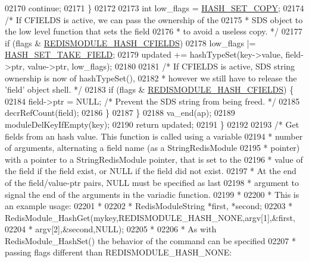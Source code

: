 \begin{DoxyCode}
{{{02170             \textcolor{keywordflow}{continue};
02171         \}
02172 
02173         \textcolor{keywordtype}{int} low\_flags = \hyperlink{server_8h_ad182dd9d0a3945ad3fb4045e559b612e}{HASH\_SET\_COPY};
02174         \textcolor{comment}{/* If CFIELDS is active, we can pass the ownership of the}
02175 \textcolor{comment}{         * SDS object to the low level function that sets the field}
02176 \textcolor{comment}{         * to avoid a useless copy. */}
02177         \textcolor{keywordflow}{if} (flags & \hyperlink{redismodule_8h_a0b45cc86dbd926d0af5d59a5f4c0e0da}{REDISMODULE\_HASH\_CFIELDS})
02178             low\_flags |= \hyperlink{server_8h_a9c13f8e0e439bfde94687cb01ab81b4b}{HASH\_SET\_TAKE\_FIELD};
02179         updated += hashTypeSet(key->value, field->ptr, value->ptr, low\_flags);
02180 
02181         \textcolor{comment}{/* If CFIELDS is active, SDS string ownership is now of hashTypeSet(),}
02182 \textcolor{comment}{         * however we still have to release the 'field' object shell. */}
02183         \textcolor{keywordflow}{if} (flags & \hyperlink{redismodule_8h_a0b45cc86dbd926d0af5d59a5f4c0e0da}{REDISMODULE\_HASH\_CFIELDS}) \{
02184            field->ptr = NULL; \textcolor{comment}{/* Prevent the SDS string from being freed. */}
02185            decrRefCount(field);
02186         \}
02187     \}
02188     va\_end(ap);
02189     moduleDelKeyIfEmpty(key);
02190     \textcolor{keywordflow}{return} updated;
02191 \}
02192 
02193 \textcolor{comment}{/* Get fields from an hash value. This function is called using a variable}
02194 \textcolor{comment}{ * number of arguments, alternating a field name (as a StringRedisModule}
02195 \textcolor{comment}{ * pointer) with a pointer to a StringRedisModule pointer, that is set to the}
02196 \textcolor{comment}{ * value of the field if the field exist, or NULL if the field did not exist.}
02197 \textcolor{comment}{ * At the end of the field/value-ptr pairs, NULL must be specified as last}
02198 \textcolor{comment}{ * argument to signal the end of the arguments in the variadic function.}
02199 \textcolor{comment}{ *}
02200 \textcolor{comment}{ * This is an example usage:}
02201 \textcolor{comment}{ *}
02202 \textcolor{comment}{ *      RedisModuleString *first, *second;}
02203 \textcolor{comment}{ *      RedisModule\_HashGet(mykey,REDISMODULE\_HASH\_NONE,argv[1],&first,}
02204 \textcolor{comment}{ *                      argv[2],&second,NULL);}
02205 \textcolor{comment}{ *}
02206 \textcolor{comment}{ * As with RedisModule\_HashSet() the behavior of the command can be specified}
02207 \textcolor{comment}{ * passing flags different than REDISMODULE\_HASH\_NONE:}
}}}
\end{DoxyCode}
